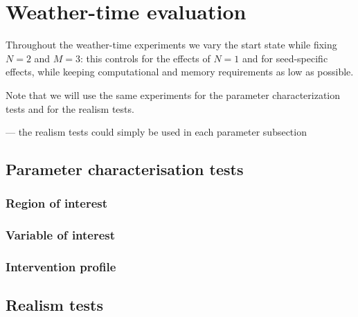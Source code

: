 \section{Weather-time evaluation}\label{sec:exp-weather}

Throughout the weather-time experiments we vary the start state while fixing $N=2$ and $M=3$: this controls for the effects of $N=1$ and for seed-specific effects, while keeping computational and memory requirements as low as possible.

Note that we will use the same experiments for the parameter characterization tests and for the realism tests.

--- the realism tests could simply be used in each parameter subsection

\subsection{Parameter characterisation tests}

\subsubsection{Region of interest}

\subsubsection{Variable of interest}

\subsubsection{Intervention profile}

\subsection{Realism tests}

